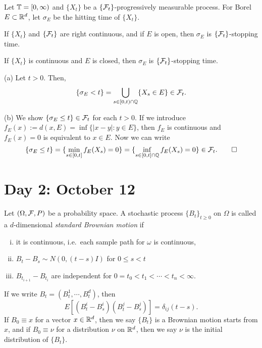 \documentclass{../../../small}
\begin{document}
\begin{prop}
Let $\mathbb{T}=[0,\infty)$ and $\{X_t\}$ be a $\{\mathcal{F}_t\}$-progressively measurable process.
For Borel $E\subset\mathbb{R}^d$, let $\sigma_E$ be the hitting time of $\{X_t\}$.
\begin{parts}
\item If $\{X_t\}$ and $\{\mathcal{F}_t\}$ are right continuous, and if $E$ is open, then $\sigma_E$ is $\{\mathcal{F}_t\}$-stopping time.
\item If $\{X_t\}$ is continuous and $E$ is closed, then $\sigma_E$ is $\{\mathcal{F}_t\}$-stopping time.
\end{parts}
\end{prop}
\begin{pf}
(a)
Let $t>0$. Then,
\[\{\sigma_E<t\}=\bigcup_{s\in[0,t)\cap\mathbb{Q}}\{X_s\in E\}\in\mathcal{F}_t.\]

(b)
We show $\{\sigma_E\le t\}\in\mathcal{F}_t$ for each $t>0$.
If we introduce $f_E(x):=d(x,E)=\inf\{|x-y|:y\in E\}$, then $f_E$ is continuous and $f_E(x)=0$ is equivalent to $x\in E$.
Now we can write
\[\{\sigma_E\le t\}=\{\min_{s\in[0,t]}f_E(X_s)=0\}=\{\inf_{s\in[0,t]\cap\mathbb{Q}}f_E(X_s)=0\}\in\mathcal{F}_t.\qedhere\]
\end{pf}


\newpage
\section{Day 2: October 12}

\begin{defn}
Let $(\Omega,\mathcal{F},P)$ be a probability space.
A stochastic process $\{B_t\}_{t\ge0}$ on $\Omega$ is called a $d$-dimensional \emph{standard Brownian motion} if
\begin{enumerate}[(i)]
\item it is continuous, i.e.~each sample path for $\omega$ is continuous,
\item $B_t-B_s\sim N(0,(t-s)I)$ for $0\le s<t$
\item $B_{t_{i+1}}-B_{t_i}$ are independent for $0=t_0<t_1<\cdots<t_n<\infty$.
\end{enumerate}
\end{defn}
\begin{rmk*}
If we write $B_t=(B_t^1,\cdots,B_t^d)$, then
\[E[(B_t^i-B_s^i)(B_t^j-B_s^j)]=\delta_{ij}(t-s).\]
If $B_0\equiv x$ for a vector $x\in\mathbb{R}^d$, then we say $\{B_t\}$ is a Brownian motion starts from $x$, and if $B_0\equiv\nu$ for a distribution $\nu$ on $\mathbb{R}^d$, then we say $\nu$ is the initial distribution of $\{B_t\}$.
\end{rmk*}
\end{document}
